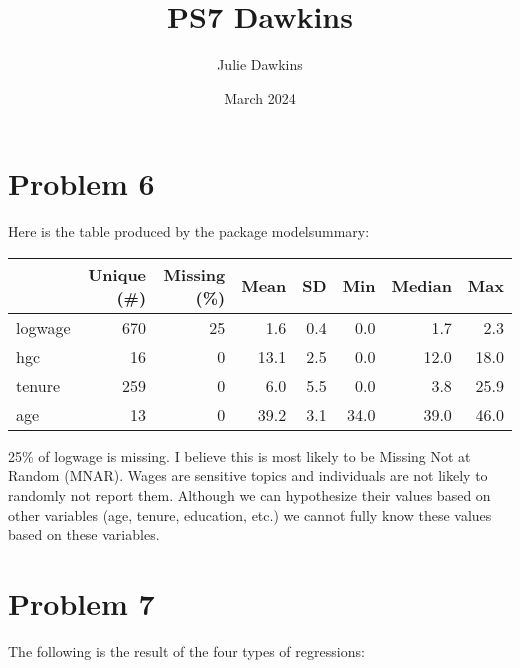 \documentclass[12pt]{article}
\title{PS7 Dawkins}
\author{Julie Dawkins}
\date{March 2024}
\begin{document}
\maketitle

\section{Problem 6}

Here is the table produced by the package modelsummary: 

\begin{table}[H]
\centering
\begin{tabular}[t]{lrrrrrrr}
\toprule
  & Unique (\#) & Missing (\%) & Mean & SD & Min & Median & Max\\
\midrule
logwage & 670 & 25 & \num{1.6} & \num{0.4} & \num{0.0} & \num{1.7} & \num{2.3}\\
hgc & 16 & 0 & \num{13.1} & \num{2.5} & \num{0.0} & \num{12.0} & \num{18.0}\\
tenure & 259 & 0 & \num{6.0} & \num{5.5} & \num{0.0} & \num{3.8} & \num{25.9}\\
age & 13 & 0 & \num{39.2} & \num{3.1} & \num{34.0} & \num{39.0} & \num{46.0}\\
\bottomrule
\end{tabular}
\end{table}

25\% of logwage is missing. I believe this is most likely to be Missing Not at Random (MNAR). Wages are sensitive topics and individuals are not likely to randomly not report them. Although we can hypothesize their values based on other variables (age, tenure, education, etc.) we cannot fully know these values based on these variables.

\section{Problem 7}

The following is the result of the four types of regressions: 
\end{document}
